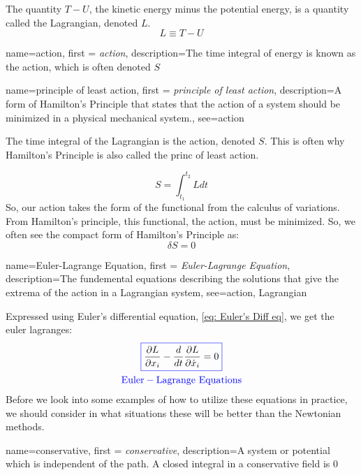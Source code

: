 \documentclass[12pt]{report}
\begin{document}
The quantity $T-U$, the kinetic energy minus the potential energy, is a quantity called the \gls{Lagrangian}, denoted $L$. 
\begin{equation}
    L\equiv T-U
\end{equation}

{
    name=action,
    first = {\textit{action}},
    description={The time integral of energy is known as the action, which is often denoted $S$}
}

{
    name=principle of least action,
    first = {\textit{principle of least action}},
    description={A form of Hamilton's Principle that states that the action of a system should be minimized in a physical mechanical system.},
    see={action}
}

The time integral of the \gls{Lagrangian} is the \gls{action}, denoted $S$. This is often why Hamilton's Principle is also called the \gls{princ of least action}. 

\begin{equation}
    S=\int_{t_1}^{t_2}{L}{dt}
\end{equation}
So, our action takes the form of the \gls{functional} from the calculus of variations. From Hamilton's principle, this \gls{functional}, the action, must be minimized. So, we often see the compact form of Hamilton's Principle as:
$$\delta S=0$$

{
    name=Euler-Lagrange Equation,
    first = {\textit{Euler-Lagrange Equation}},
    description={The fundemental equations describing the solutions that give the extrema of the action in a Lagrangian system},
    see={action, Lagrangian}
}

Expressed using Euler's differential equation, \eqref{eq: Euler's Diff eq}, we get the \glspl{euler lagrange}:
\begin{gather}\label{eq: Euler-Lagrange}
    \color{blue}\boxed{\color{black}\frac{\partial L}{\partial x_i}-\frac{d}{dt}\frac{\partial L}{\partial \dot{x}_i}=0}\\ \mathrm{\color{blue}Euler-Lagrange \ Equations}
\end{gather}
Before we look into some examples of how to utilize these equations in practice, we should consider in what situations these will be better than the Newtonian methods.

{
    name=conservative,
    first = {\textit{conservative}},
    description={A system or potential which is independent of the path. A closed integral in a conservative field is 0}
}
\end{document}
